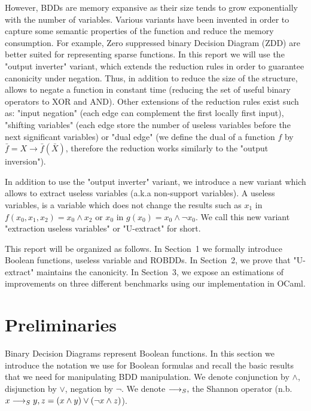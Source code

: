 \documentclass[a4paper,10pt]{article}
\begin{document}
However, BDDs are memory expansive as their size tends to grow exponentially with the number of variables.
Various variants have been invented in order to capture some semantic properties of the function and reduce the memory consumption.
For example, Zero suppressed binary Decision Diagram (ZDD) are better suited for representing sparse functions.
In this report we will use the "output inverter" variant\cite{BryantVariantN}, which extends the reduction rules in order to guarantee canonicity under negation.
Thus, in addition to reduce the size of the structure, allows to negate a function in constant time (reducing the set of useful binary operators to XOR and AND).
Other extensions of the reduction rules exist such as: "input negation"\cite{MinatoVariants} (each edge can complement the first locally first input), "shifting variables"\cite{MinatoVariants} (each edge store the number of useless variables before the next significant variables) or "dual edge"\cite{RolfVariantDual} (we define the dual of a function $f$ by $\bar{f} = X \longrightarrow \bar{f}(\bar{X})$, therefore the reduction works similarly to the "output inversion").


In addition to use the "output inverter" variant, we introduce a new variant which allows to extract useless variables (a.k.a non-support variables).
A useless variables, is a variable which does not change the results such as $x_1$ in $f(x_0, x_1, x_2) = x_0 \land x_2$ or $x_0$ in $g(x_0) = x_0 \land \lnot x_0$.
We call this new variant "extraction useless variables" or "U-extract" for short.


This report will be organized as follows. In Section~1 we formally introduce Boolean functions, useless variable and ROBDDs. In Section~2, we prove that "U-extract" maintains the canonicity. In Section~3, we expose an estimations of improvements on three different benchmarks \cite{BenchSatlib, BenchLgsynth91, BenchIscas99} using our implementation in OCaml.

\section{Preliminaries}

Binary Decision Diagrams represent Boolean functions. In this section we introduce the notation we use for Boolean formulas and recall the basic results that we need for manipulating BDD manipulation.  We denote conjunction by $\land$, disjunction by $\lor$, negation by $\lnot$. We denote $\longrightarrow_S ,$ the Shannon operator (n.b. $x \longrightarrow_S y, z = (x \land y) \lor (\lnot x \land z)$).
\end{document}
